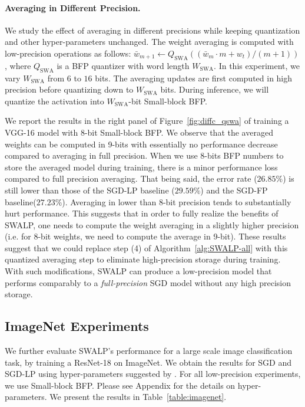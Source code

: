 \documentclass{article}
\begin{document}
\vspace{-1mm}
\paragraph{Averaging in Different Precision.}
We study the effect of averaging in different precisions while keeping quantization and other hyper-parameters unchanged.
The weight averaging is computed with low-precision operations as follows:
$\bar{w}_{m+1} \leftarrow Q_{\text{SWA}}((\bar{w}_{m} \cdot m + w_t)/(m + 1))$,
where $Q_{\text{SWA}}$ is a BFP quantizer with word length $W_{\text{SWA}}$.
In this experiment, we vary $W_{\text{SWA}}$ from $6$ to $16$ bits. 
The averaging updates are first computed in high precision before quantizing down to $W_{\text{SWA}}$ bits.
During inference, we will quantize the activation into $W_{\text{SWA}}$-bit Small-block BFP.

We report the results in the right panel of Figure~\ref{fig:diffc_qswa} of training a VGG-16 model with 8-bit Small-block BFP. 
We observe that the averaged weights can be computed in 9-bits with essentially no performance decrease compared to averaging in full precision.
When we use 8-bits BFP numbers to store the averaged model during training, there is a minor performance loss compared to full precision averaging.
That being said, the error rate ($26.85\%$) is still lower than those of the SGD-LP baseline ($29.59\%$) and the SGD-FP baseline($27.23\%$).
Averaging in lower than  8-bit precision tends to substantially hurt performance. 
This suggests that in order to fully realize the benefits of SWALP, one needs to compute the weight averaging in a slightly higher precision (i.e. for 8-bit weights, we need to compute the average in 9-bit).
These results suggest that we could replace step (4) of Algorithm~\ref{alg:SWALP-all} with this quantized averaging step to eliminate high-precision storage during training.
With such modifications, SWALP can produce a low-precision model that performs comparably to a \emph{full-precision} SGD model without any high precision storage.

\subsection{ImageNet Experiments}

We further evaluate SWALP's performance for a large scale image classification task, by training a ResNet-18 on ImageNet. We obtain the results for SGD and SGD-LP using hyper-parameters suggested by \citet{resnet}. 
For all low-precision experiments, we use Small-block BFP. Please see Appendix for the details on hyper-parameters. 
We present the results in Table~\ref{table:imagenet}. 
\end{document}
